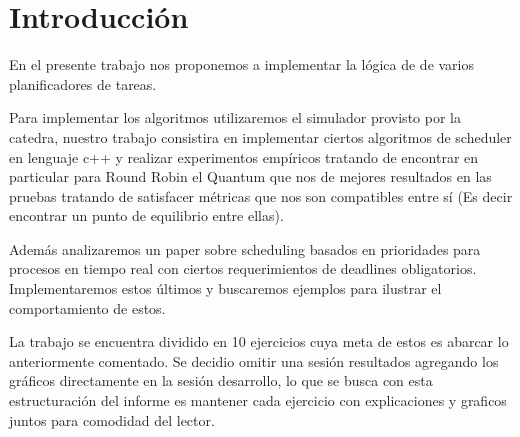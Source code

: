 \section{Introducción}

En el presente trabajo nos proponemos a implementar la lógica de de varios planificadores de tareas.

Para implementar los algoritmos utilizaremos el simulador provisto por la catedra, nuestro trabajo consistira en implementar ciertos algoritmos de scheduler en lenguaje c++ y realizar experimentos empíricos tratando de encontrar en particular para Round Robin el Quantum que nos de mejores resultados en las pruebas tratando de satisfacer métricas que nos son compatibles entre sí (Es decir encontrar un punto de equilibrio entre ellas).

Además analizaremos un paper sobre scheduling basados en prioridades para procesos en tiempo real con ciertos requerimientos de deadlines obligatorios. Implementaremos estos últimos y buscaremos ejemplos para ilustrar el comportamiento de estos.

La trabajo se encuentra dividido en 10 ejercicios cuya meta de estos es abarcar lo anteriormente comentado. Se decidio omitir una sesión resultados agregando los gráficos directamente en la sesión desarrollo, lo que se busca con esta estructuración del informe es mantener cada ejercicio con explicaciones y graficos juntos para comodidad del lector.

